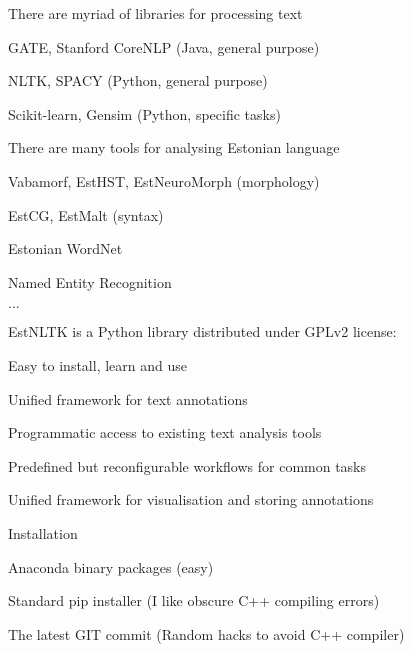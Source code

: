 \documentclass[landscape,footrule]{foils}
\begin{document}
\titlefoil

\LogoOn

There are myriad of libraries for processing text
\begin{triangles}
\item GATE, Stanford CoreNLP (Java, general purpose) 
\item NLTK, SPACY (Python, general purpose)
\item Scikit-learn, Gensim (Python, specific tasks)\vspace*{1cm}
\end{triangles}

There are many tools for analysing Estonian language
\begin{triangles}
\item Vabamorf, EstHST, EstNeuroMorph (morphology)
\item EstCG, EstMalt (syntax) 
\item Estonian WordNet
\item Named Entity Recognition
\item $\ldots$
\end{triangles} 


EstNLTK is a Python library distributed under GPLv2 license: 
\begin{triangles}
\item Easy to install, learn and use  
\item Unified framework for text annotations 
\item Programmatic access to existing text analysis tools
\item Predefined but reconfigurable workflows for common tasks
\item Unified framework for visualisation and storing annotations\vspace*{1cm}
\end{triangles}


Installation
\begin{triangles}
\item Anaconda binary packages (easy)
\item Standard pip installer (I like obscure C++ compiling errors)
\item The latest GIT commit (Random hacks to avoid C++ compiler)\vspace*{1cm}
\end{triangles}
\end{document}
